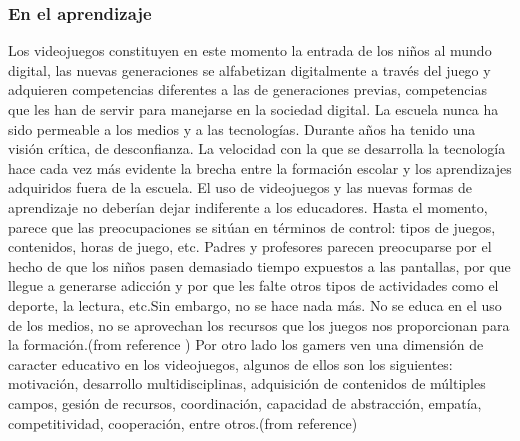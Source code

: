 \documentclass{bmcart}
\begin{document}
\subsubsection*{En el aprendizaje}
Los videojuegos constituyen en este momento la entrada de los niños al mundo digital, las nuevas generaciones se alfabetizan digitalmente a través del juego y adquieren competencias diferentes a las de generaciones previas, competencias que les han de servir para manejarse en la sociedad digital.
\newline
La escuela nunca ha sido permeable a los medios y a las tecnologías.
Durante años ha tenido una visión crítica, de desconfianza. La velocidad con la que se desarrolla la tecnología hace cada vez más evidente la brecha entre la formación escolar y los aprendizajes adquiridos fuera de la escuela.
\newline
El uso de videojuegos y las nuevas formas de aprendizaje no deberían dejar indiferente a los educadores. Hasta el momento, parece que las preocupaciones se sitúan en términos de control: tipos de juegos, contenidos, horas de juego, etc. Padres y profesores parecen preocuparse por el hecho de que los niños pasen demasiado tiempo expuestos a las pantallas, por que llegue a generarse adicción y por que les falte otros tipos de actividades como el deporte, la lectura, etc.Sin embargo, no se hace nada más. No se educa en el uso de los medios, no se aprovechan los recursos que los juegos nos proporcionan para la formación.(from reference \cite{salvat2008videojuegos})
\newline
Por otro lado los gamers ven una dimensión de caracter educativo en los videojuegos, algunos de ellos son los siguientes: motivación, desarrollo multidisciplinas, adquisición de contenidos de múltiples campos, gesión de recursos, coordinación, capacidad de abstracción, empatía, competitividad, cooperación, entre otros.(from reference\cite{dominguez2012que})
\newline
\newline
\end{document}
